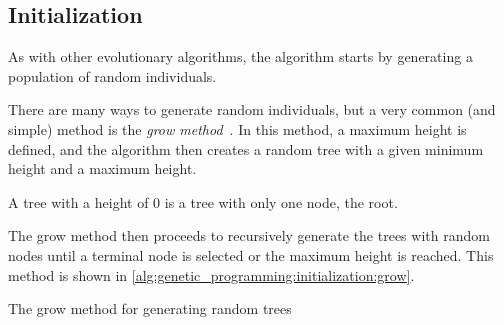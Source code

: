 \subsection{Initialization}
\label{sec:genetic_programming:initialization}
  As with other evolutionary algorithms, the algorithm starts by generating a
  population of random individuals.
  
  There are many ways to generate random individuals, but a very common (and
  simple) method is the \emph{grow 
  method}~\autocite{kozaGeneticProgrammingProgramming1992a}.
  In this method, a maximum height is defined, and the algorithm then creates a
  random tree with a given minimum height and a maximum height.

  \begin{remark}
    A tree with a height of 0 is a tree with only one node, the root.
  \end{remark}

  The grow method then proceeds to recursively generate the trees with random
  nodes until a terminal node is selected or the maximum height is reached.
  This method is shown in \vref{alg:genetic_programming:initialization:grow}.

  \begin{algorithm}[ht!]
    \caption{The grow method for generating random trees}
    \label{alg:genetic_programming:initialization:grow}
  \end{algorithm}

